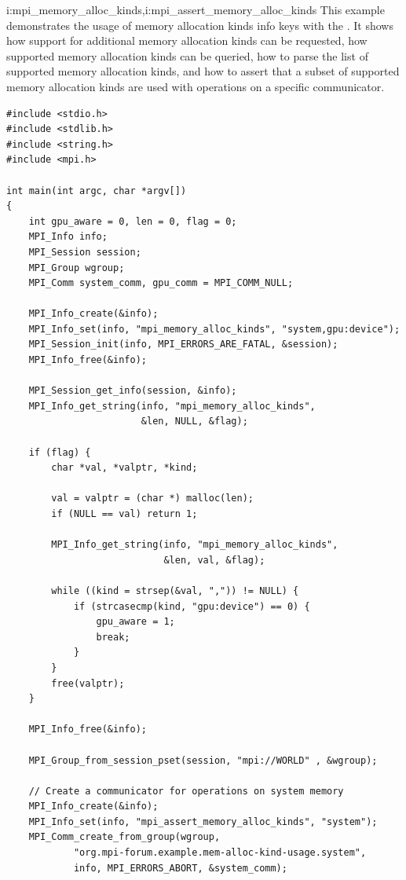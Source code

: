 \begin{example}
\label{example:alloc-kinds-spm}
{i:mpi\_memory\_alloc\_kinds,i:mpi\_assert\_memory\_alloc\_kinds}%
This example demonstrates the usage of memory allocation kinds info keys with the \spm.
It shows how support for additional memory allocation kinds can be requested,
how supported memory allocation kinds can be queried,
how to parse the list of supported memory allocation kinds,
and how to assert that a subset of supported memory allocation kinds are used
with operations on a specific communicator.
\begin{lstlisting}[language={[MPI]C}]
#include <stdio.h>
#include <stdlib.h>
#include <string.h>
#include <mpi.h>

int main(int argc, char *argv[])
{
    int gpu_aware = 0, len = 0, flag = 0;
    MPI_Info info;
    MPI_Session session;
    MPI_Group wgroup;
    MPI_Comm system_comm, gpu_comm = MPI_COMM_NULL;

    MPI_Info_create(&info);
    MPI_Info_set(info, "mpi_memory_alloc_kinds", "system,gpu:device");
    MPI_Session_init(info, MPI_ERRORS_ARE_FATAL, &session);
    MPI_Info_free(&info);

    MPI_Session_get_info(session, &info);
    MPI_Info_get_string(info, "mpi_memory_alloc_kinds",
                        &len, NULL, &flag);

    if (flag) {
        char *val, *valptr, *kind;

        val = valptr = (char *) malloc(len);
        if (NULL == val) return 1;

        MPI_Info_get_string(info, "mpi_memory_alloc_kinds",
                            &len, val, &flag);

        while ((kind = strsep(&val, ",")) != NULL) {
            if (strcasecmp(kind, "gpu:device") == 0) {
                gpu_aware = 1;
                break;
            }
        }
        free(valptr);
    }

    MPI_Info_free(&info);

    MPI_Group_from_session_pset(session, "mpi://WORLD" , &wgroup);

    // Create a communicator for operations on system memory
    MPI_Info_create(&info);
    MPI_Info_set(info, "mpi_assert_memory_alloc_kinds", "system");
    MPI_Comm_create_from_group(wgroup,
            "org.mpi-forum.example.mem-alloc-kind-usage.system",
            info, MPI_ERRORS_ABORT, &system_comm);


\end{lstlisting}
\end{example}
